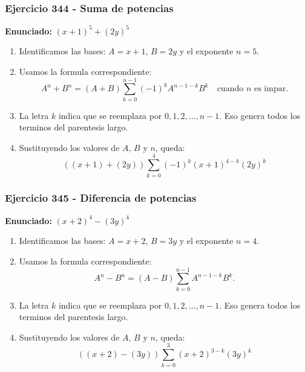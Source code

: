 \documentclass[11pt,a4paper]{article}
\begin{document}
\subsubsection*{Ejercicio 344 - Suma de potencias}
\textbf{Enunciado:} $ \left(x + 1\right)^{5}+\left(2 y\right)^{5} $\par
\begin{enumerate}[leftmargin=2em]
\item Identificamos las bases: \(A=x + 1\), \(B=2 y\) y el exponente \(n=5\).
\item Usamos la formula correspondiente: \[A^n+B^n=(A+B)\sum_{k=0}^{n-1}(-1)^kA^{n-1-k}B^k\quad\text{cuando }n\text{ es impar}.\]
\item La letra \(k\) indica que se reemplaza por \(0,1,2,\ldots,n-1\). Eso genera todos los terminos del parentesis largo.
\item Sustituyendo los valores de \(A\), \(B\) y \(n\), queda: \[\boxed{\left(\left(x + 1\right)+\left(2 y\right)\right)\sum_{k=0}^{4}(-1)^k\left(x + 1\right)^{4-k}\left(2 y\right)^k}\]
\end{enumerate}

\vspace{0.2cm}
\subsubsection*{Ejercicio 345 - Diferencia de potencias}
\textbf{Enunciado:} $ \left(x + 2\right)^{4}-\left(3 y\right)^{4} $\par
\begin{enumerate}[leftmargin=2em]
\item Identificamos las bases: \(A=x + 2\), \(B=3 y\) y el exponente \(n=4\).
\item Usamos la formula correspondiente: \[A^n-B^n=(A-B)\sum_{k=0}^{n-1}A^{n-1-k}B^k.\]
\item La letra \(k\) indica que se reemplaza por \(0,1,2,\ldots,n-1\). Eso genera todos los terminos del parentesis largo.
\item Sustituyendo los valores de \(A\), \(B\) y \(n\), queda: \[\boxed{\left(\left(x + 2\right)-\left(3 y\right)\right)\sum_{k=0}^{3}\left(x + 2\right)^{3-k}\left(3 y\right)^k}\]
\end{enumerate}

\vspace{0.2cm}
\end{document}
